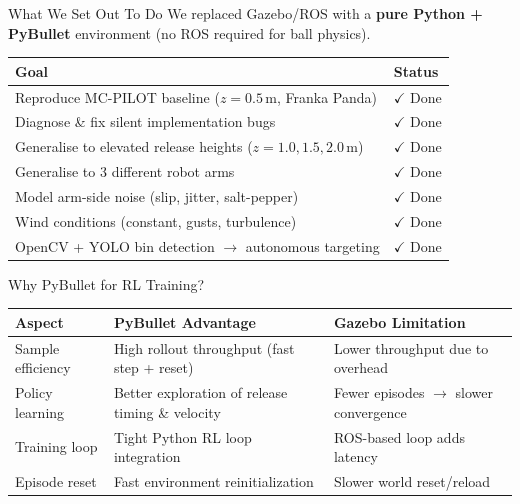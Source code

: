 \documentclass{if-beamer}
\begin{document}
\begin{frame}{What We Set Out To Do}
    We replaced Gazebo/ROS with a \textbf{pure Python + PyBullet} environment (no ROS required for ball physics).

    \vspace{0.5em}
    \begin{center}
    \small
    \begin{tabular}{ll}
        \toprule
        \textbf{Goal} & \textbf{Status} \\
        \midrule
        Reproduce MC-PILOT baseline ($z=0.5$\,m, Franka Panda) & \textcolor{green!60!black}{$\checkmark$ Done} \\
        Diagnose \& fix silent implementation bugs & \textcolor{green!60!black}{$\checkmark$ Done} \\
        Generalise to elevated release heights ($z=1.0,1.5,2.0$\,m) & \textcolor{green!60!black}{$\checkmark$ Done} \\
        Generalise to 3 different robot arms & \textcolor{green!60!black}{$\checkmark$ Done} \\
        Model arm-side noise (slip, jitter, salt-pepper) & \textcolor{green!60!black}{$\checkmark$ Done} \\
        Wind conditions (constant, gusts, turbulence) & \textcolor{green!60!black}{$\checkmark$ Done} \\
        OpenCV + YOLO bin detection $\rightarrow$ autonomous targeting & \textcolor{green!60!black}{$\checkmark$ Done} \\
        \bottomrule
    \end{tabular}
    \end{center}
\end{frame}

\begin{frame}{Why PyBullet for RL Training?}
    \centering
    \small
    \begin{tabular}{p{2.3cm}p{4.3cm}p{3.8cm}}
        \toprule
        \textbf{Aspect} & \textbf{PyBullet Advantage} & \textbf{Gazebo Limitation} \\
        \midrule
        Sample efficiency & High rollout throughput (fast step + reset) & Lower throughput due to overhead \\
        Policy learning & Better exploration of release timing \& velocity & Fewer episodes $\rightarrow$ slower convergence \\
        Training loop & Tight Python RL loop integration & ROS-based loop adds latency \\
        Episode reset & Fast environment reinitialization & Slower world reset/reload \\
        \bottomrule
    \end{tabular}
\end{frame}
\end{document}
